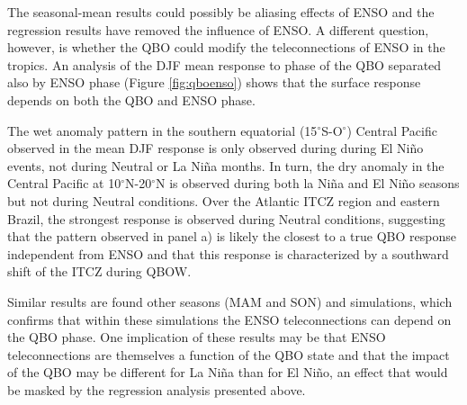 The seasonal-mean  results could possibly be aliasing effects of ENSO and the regression results have removed the influence of ENSO. A different question, however, is whether the QBO could modify the teleconnections of ENSO in the tropics. An analysis of the DJF mean response to phase of the QBO separated also by ENSO phase (Figure \ref{fig:qboenso}) shows that the surface response depends on both the QBO and ENSO phase. %

The wet anomaly pattern in the southern equatorial (15$^\circ$S-O$^\circ$) Central Pacific observed in the mean DJF response is only observed during during El Niño events, not during Neutral or La Niña months. In turn, the dry anomaly in the Central Pacific at 10$^\circ$N-20$^\circ$N is observed during both la Niña and El Niño seasons but not during Neutral conditions.
 Over the Atlantic ITCZ region and eastern Brazil, the strongest response is observed during Neutral conditions, suggesting that the pattern observed in panel a) is likely the closest to a true QBO response independent from ENSO and that this response is characterized by a southward shift of the ITCZ during QBOW. 

Similar results are found other seasons (MAM and SON) and simulations, which confirms that within these simulations the ENSO teleconnections can depend on the QBO phase.
One implication of these results may be that ENSO teleconnections are themselves a function of the QBO state and that the impact of the QBO may be different for La Niña than for El Niño, an effect that would be masked by the regression analysis presented above. 


